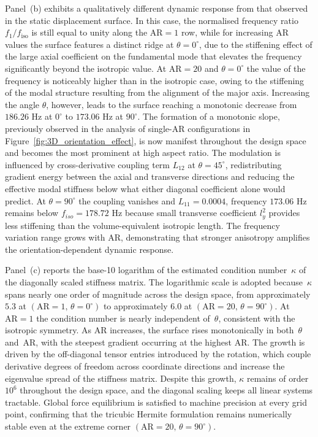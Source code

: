 \documentclass[final,3p,times,fleqn]{elsarticle}
\begin{document}
Panel~(b) exhibits a qualitatively different dynamic response from
that observed in the static displacement surface.
In this case, the normalised frequency ratio $f_{1}/f_{\mathrm{iso}}$
is still equal to unity along the $\mathrm{AR}=1$ row, while for
increasing $\mathrm{AR}$ values the surface features a distinct
ridge at $\theta = 0^{\circ}$, due to the stiffening effect of the
large axial coefficient on the fundamental mode that elevates the
frequency significantly beyond the isotropic value.
At $\mathrm{AR}=20$ and $\theta = 0^{\circ}$ the value of the
frequency is noticeably higher than in the isotropic case, owing to
the stiffening of the modal structure resulting from the alignment of the
major axis.
Increasing the angle $\theta$, however, leads to the surface reaching a
monotonic decrease from $186.26$ Hz at $0^{\circ}$ to $173.06$ Hz at $90^{\circ}$.
The formation of a monotonic slope, previously observed in the analysis of
single-$\mathrm{AR}$ configurations in Figure~\ref{fig:3D_orientation_effect},
is now manifest throughout the design space and becomes the most
prominent at high aspect ratio.
The modulation is influenced by cross-derivative coupling term $L_{12}$ at
$\theta = 45^{\circ}$, redistributing gradient energy
between the axial and transverse directions and reducing the
effective modal stiffness below what either diagonal coefficient
alone would predict.
At $\theta=90^{\circ}$ the coupling vanishes and $L_{11}=0.0004$, frequency $173.06$ Hz remains below $f_{iso}=178.72$ Hz because small transverse coefficient $l_{y}^{2}$ provides less stiffening
than the volume-equivalent isotropic length.
The frequency variation range grows with AR,
demonstrating that stronger anisotropy amplifies the
orientation-dependent dynamic response.

Panel~(c) reports the base-10 logarithm of the estimated condition
number~$\kappa$ of the diagonally scaled stiffness matrix.
The logarithmic scale is adopted because~$\kappa$ spans nearly one
order of magnitude across the design space, from approximately
$5.3$ at $(\mathrm{AR}=1,\,\theta = 0^{\circ})$ to approximately
$6.0$ at $(\mathrm{AR}=20,\,\theta = 90^{\circ})$.
At $\mathrm{AR}=1$ the condition number is nearly independent
of~$\theta$, consistent with the isotropic symmetry.
As AR increases, the surface rises monotonically in both~$\theta$
and~AR, with the steepest gradient occurring at the highest AR.
The growth is driven by the off-diagonal tensor entries introduced
by the rotation, which couple derivative degrees of freedom across
coordinate directions and increase the eigenvalue spread of the
stiffness matrix.
Despite this growth, $\kappa$ remains of order~$10^{6}$ throughout
the design space, and the diagonal scaling keeps all linear systems
tractable.
Global force equilibrium is satisfied to machine precision at every
grid point, confirming that the tricubic Hermite formulation remains
numerically stable even at the extreme corner
$(\mathrm{AR}=20,\,\theta = 90^{\circ})$.
\end{document}
